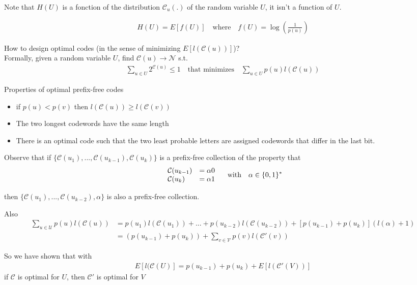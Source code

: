 \documentclass[twoside]{article}
\theoremstyle{definition} %
\def\V{\mathcal{V}}
\def\U{\mathcal{U}}
\def\N{\mathcal{N}}
\def\C{\mathcal{C}}
\begin{document}
Note that $H(U)$ is a fonction of the distribution $\C_u(.)$ of the random variable $U$, it isn't a function of $U$.

\begin{align*}
  H(U) = E[f(U)] \quad \text{where} \quad f(U) = \log(\frac{1}{p(u)})
\end{align*}

How to design optimal codes (in the sense of minimizing $E[l(\C(u))]$)? \\
Formally, given a random variable $U$, find $\C(u) \rightarrow \N$ s.t.
\begin{align*}
  \sum_{u \in U} 2^{\C(u)} \leq 1
\quad \text{that minimizes} \quad
  \sum_{u \in U} p(u)l(\C(u))
\end{align*}

Properties of optimal prefix-free codes
\begin{itemize}
  \item if $p(u) < p(v)$ then $l(\C(u)) \geq l(\C(v))$
  \item The two longest codewords have the same length
  \item There is an optimal code such that the two least probable letters are assigned codewords that differ in the last bit.
\end{itemize}

Observe that if $\{\C(u_1), ... , \C(u_{k-1}), \C(u_k)\}$ is a prefix-free collection of the property that
\begin{align*}
\left.
\begin{array}{l l}
  \C(u_{k-1}) &= \alpha 0 \\
  \C(u_k)     &= \alpha 1
\end{array}
\right.
\quad \text{with} \quad \alpha \in \{ 0, 1\}^*
\end{align*}

then $\{\C(u_1), ..., \C(u_{k-2}), \alpha\}$ is also a prefix-free collection.

Also
\begin{align*}
  \sum_{u \in \U} p(u) l(\C(u)) &= p(u_1) l(\C(u_1)) + ... +  p(u_{k-2}) l(\C(u_{k-2}))
  + [p(u_{k-1}) + p(u_k)](l(\alpha) + 1) \\
  &= (p(u_{k-1}) + p(u_k)) + \sum_{v \in \V} p(v) l(\C'(v))
\end{align*}

So we have shown that with
\begin{align*}
  E[l(\C(U)] = p(u_{k-1}) + p(u_k) + E[l(\C'(V))]
\end{align*}
if $\C$ is optimal for $U$, then $\C'$ is optimal for $V$
\end{document}
